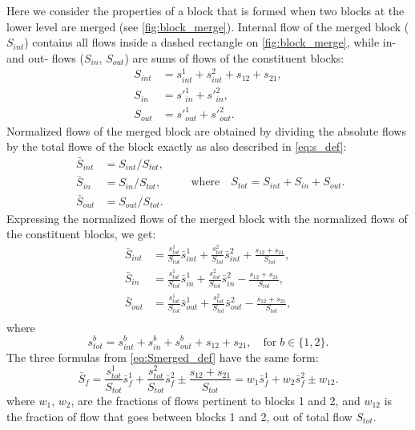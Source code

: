 \documentclass[a4paper,12pt]{article}
\begin{document}
\begin{appendices}
Here we consider the properties of a block that is formed when two blocks at the lower level are merged (see \cref{fig:block_merge}).
Internal flow of the merged block ($S_{int}$) contains all flows inside a dashed rectangle on \cref{fig:block_merge}, while in- and out- flows ($S_{in}$, $S_{out}$) are sums of flows of the constituent blocks:
\begin{equation}
  \begin{aligned}
    S_{int} &= s^1_{int}+s^2_{int}+s_{12}+s_{21}, \\
    S_{in}  &= s'^1_{in}+s'^2_{in}, \\
    S_{out} &= s'^1_{out}+s'^2_{out}.
  \end{aligned}
  \label{eq:S_def}
\end{equation}
Normalized flows of the merged block are obtained by dividing the absolute flows by the total flows of the block exactly as also described in \cref{eq:s_def}:
\begin{equation}
  \begin{aligned}
    \bar{S}_{int} &= S_{int}/S_{tot}, \\
    \bar{S}_{in}  &= S_{in}/S_{tot}, \\
    \bar{S}_{out} &= S_{out}/S_{tot}.
  \end{aligned}
  \qquad \text{where} \quad S_{tot}=S_{int}+S_{in}+S_{out}.
  \label{eq:Sbar_def}
\end{equation}
Expressing the normalized flows of the merged block with the normalized flows of the constituent blocks, we get:
\begin{equation}
  \begin{aligned}
    \bar{S}_{int} &= \frac{s^1_{tot}}{S_{tot}}\bar{s}^1_{int}
                   + \frac{s^2_{tot}}{S_{tot}}\bar{s}^2_{int}
                   + \frac{s_{12}+s_{21}}{S_{tot}}, \\
    \bar{S}_{in}  &= \frac{s^1_{tot}}{S_{tot}}\bar{s}^1_{in}
                   + \frac{s^2_{tot}}{S_{tot}}\bar{s}^2_{in}
                   - \frac{s_{12}+s_{21}}{S_{tot}}, \\
    \bar{S}_{out} &= \frac{s^1_{tot}}{S_{tot}}\bar{s}^1_{out}
                   + \frac{s^2_{tot}}{S_{tot}}\bar{s}^2_{out}
                   - \frac{s_{12}+s_{21}}{S_{tot}}, \\
  \end{aligned}
  \label{eq:Smerged_def}
\end{equation}
where
\begin{equation}
  s^b_{tot}=s^b_{int}+s^b_{in}+s^b_{out}+s_{12}+s_{21}, \quad \text{for} \; b \in \{1,2\}.
\end{equation}
The three formulas from \cref{eq:Smerged_def} have the same form:
\begin{equation}
  \bar{S}_{f} = \frac{s^1_{tot}}{S_{tot}}\bar{s}^1_{f}
              + \frac{s^2_{tot}}{S_{tot}}\bar{s}^2_{f}
              \pm \frac{s_{12}+s_{21}}{S_{tot}}
              = w_1 \bar{s}^1_f + w_2 \bar{s}^2_f \pm w_{12}.
  \label{eq:Sf}
\end{equation}
where $w_1$, $w_2$, are the fractions of flows pertinent to blocks 1 and 2,
and $w_{12}$ is the fraction of flow that goes between blocks 1 and 2,
out of total flow $S_{tot}$.

\end{appendices}




\end{document}
